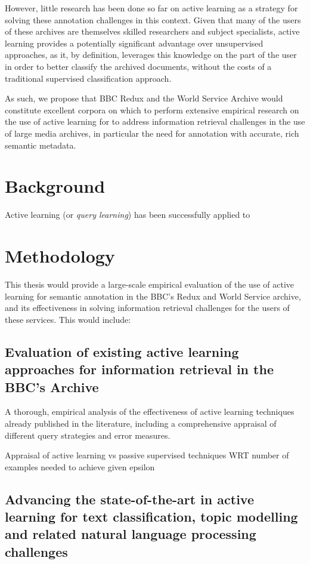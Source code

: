 \documentclass[a4paper, 11pt]{article}
\begin{document}
However, little research has been done so far on active learning as a strategy for solving these annotation challenges in this context. Given that many of the users of these archives are themselves skilled researchers and subject specialists, active learning provides a potentially significant advantage over unsupervised approaches, as it, by definition, leverages this knowledge on the part of the user in order to better classify the archived documents, without the costs of a traditional supervised classification approach.

As such, we propose that BBC Redux and the World Service Archive would constitute excellent corpora on which to perform extensive empirical research on the use of active learning for to address information retrieval challenges in the use of large media archives, in particular the need for annotation with accurate, rich semantic metadata.

\section{Background}
Active learning (or \textit{query learning}) has been successfully applied to
\section{Methodology}
This thesis would provide a large-scale empirical evaluation of the use of active learning for semantic annotation in the BBC's Redux and World Service archive, and its effectiveness in solving information retrieval challenges for the users of these services. This would include:

\subsection{Evaluation of existing active learning approaches for information retrieval in the BBC's Archive}

A thorough, empirical analysis of the effectiveness of active learning techniques already published in the literature, including a comprehensive appraisal of different query strategies and error measures.

Appraisal of active learning vs passive supervised techniques WRT number of examples needed to achieve given epsilon

\subsection{Advancing the state-of-the-art in active learning for text classification, topic modelling and related natural language processing challenges}
\end{document}

